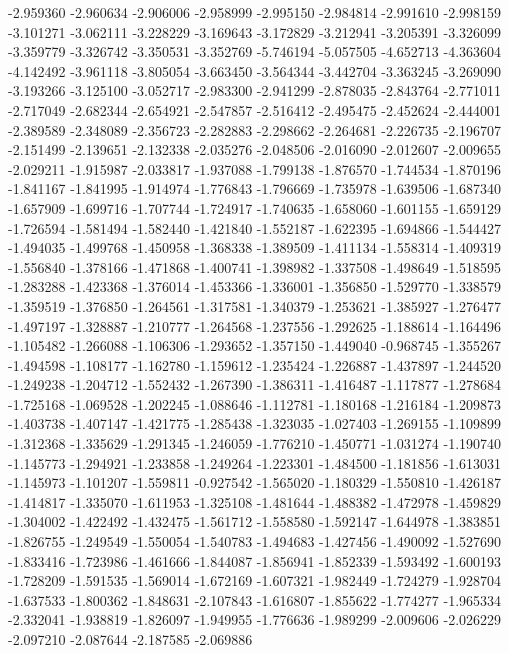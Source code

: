-2.959360
-2.960634
-2.906006
-2.958999
-2.995150
-2.984814
-2.991610
-2.998159
-3.101271
-3.062111
-3.228229
-3.169643
-3.172829
-3.212941
-3.205391
-3.326099
-3.359779
-3.326742
-3.350531
-3.352769
-5.746194
-5.057505
-4.652713
-4.363604
-4.142492
-3.961118
-3.805054
-3.663450
-3.564344
-3.442704
-3.363245
-3.269090
-3.193266
-3.125100
-3.052717
-2.983300
-2.941299
-2.878035
-2.843764
-2.771011
-2.717049
-2.682344
-2.654921
-2.547857
-2.516412
-2.495475
-2.452624
-2.444001
-2.389589
-2.348089
-2.356723
-2.282883
-2.298662
-2.264681
-2.226735
-2.196707
-2.151499
-2.139651
-2.132338
-2.035276
-2.048506
-2.016090
-2.012607
-2.009655
-2.029211
-1.915987
-2.033817
-1.937088
-1.799138
-1.876570
-1.744534
-1.870196
-1.841167
-1.841995
-1.914974
-1.776843
-1.796669
-1.735978
-1.639506
-1.687340
-1.657909
-1.699716
-1.707744
-1.724917
-1.740635
-1.658060
-1.601155
-1.659129
-1.726594
-1.581494
-1.582440
-1.421840
-1.552187
-1.622395
-1.694866
-1.544427
-1.494035
-1.499768
-1.450958
-1.368338
-1.389509
-1.411134
-1.558314
-1.409319
-1.556840
-1.378166
-1.471868
-1.400741
-1.398982
-1.337508
-1.498649
-1.518595
-1.283288
-1.423368
-1.376014
-1.453366
-1.336001
-1.356850
-1.529770
-1.338579
-1.359519
-1.376850
-1.264561
-1.317581
-1.340379
-1.253621
-1.385927
-1.276477
-1.497197
-1.328887
-1.210777
-1.264568
-1.237556
-1.292625
-1.188614
-1.164496
-1.105482
-1.266088
-1.106306
-1.293652
-1.357150
-1.449040
-0.968745
-1.355267
-1.494598
-1.108177
-1.162780
-1.159612
-1.235424
-1.226887
-1.437897
-1.244520
-1.249238
-1.204712
-1.552432
-1.267390
-1.386311
-1.416487
-1.117877
-1.278684
-1.725168
-1.069528
-1.202245
-1.088646
-1.112781
-1.180168
-1.216184
-1.209873
-1.403738
-1.407147
-1.421775
-1.285438
-1.323035
-1.027403
-1.269155
-1.109899
-1.312368
-1.335629
-1.291345
-1.246059
-1.776210
-1.450771
-1.031274
-1.190740
-1.145773
-1.294921
-1.233858
-1.249264
-1.223301
-1.484500
-1.181856
-1.613031
-1.145973
-1.101207
-1.559811
-0.927542
-1.565020
-1.180329
-1.550810
-1.426187
-1.414817
-1.335070
-1.611953
-1.325108
-1.481644
-1.488382
-1.472978
-1.459829
-1.304002
-1.422492
-1.432475
-1.561712
-1.558580
-1.592147
-1.644978
-1.383851
-1.826755
-1.249549
-1.550054
-1.540783
-1.494683
-1.427456
-1.490092
-1.527690
-1.833416
-1.723986
-1.461666
-1.844087
-1.856941
-1.852339
-1.593492
-1.600193
-1.728209
-1.591535
-1.569014
-1.672169
-1.607321
-1.982449
-1.724279
-1.928704
-1.637533
-1.800362
-1.848631
-2.107843
-1.616807
-1.855622
-1.774277
-1.965334
-2.332041
-1.938819
-1.826097
-1.949955
-1.776636
-1.989299
-2.009606
-2.026229
-2.097210
-2.087644
-2.187585
-2.069886
